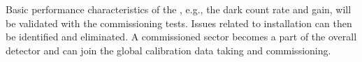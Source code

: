 Basic performance characteristics of the , e.g., the dark count rate and gain, will be validated with the commissioning tests. Issues related to installation can then be identified and eliminated. A commissioned sector becomes a part of the overall detector and can join the global calibration data taking and commissioning.


